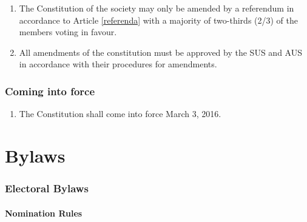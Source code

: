 \begin{enumerate}
\def\labelenumi{\arabic{enumi}.}
\item
  The Constitution of the society may only be amended by a referendum in
  accordance to Article \ref{referenda} with a majority of two-thirds (2/3) of the
  members voting in favour.
\item
  All amendments of the constitution must be approved by the SUS and AUS
  in accordance with their procedures for amendments.
\end{enumerate}

\section{Coming into force}\label{coming-into-force}

\begin{enumerate}
\def\labelenumi{\arabic{enumi}.}
\tightlist
\item
  The Constitution shall come into force March 3, 2016.
\end{enumerate}

\part{Bylaws}\label{bylaws}
\setcounter{section}{0}
\renewcommand\thesection{\Alph{section}}

\section{Electoral Bylaws}\label{electoral-bylaws}

\subsection{Nomination Rules}\label{nomination-rules}

